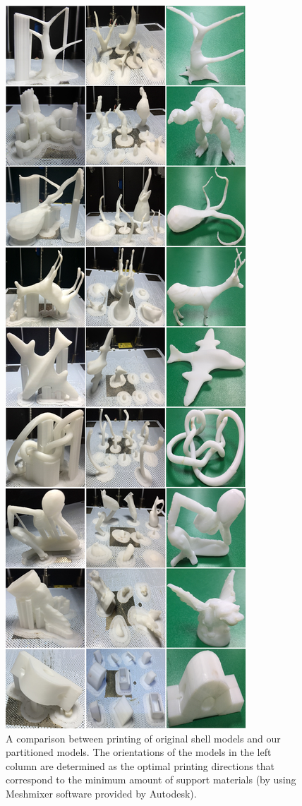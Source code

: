 \begin{figure}[t]
  \centering
  \includegraphics[width=0.975\linewidth]{figs/experiment.png}
  \caption{\label{fig:experiment}%
           A comparison between printing of original shell models and our partitioned models. The orientations of the models in the left column are determined as the optimal printing directions that correspond to the minimum amount of support materials (by using Meshmixer software provided by Autodesk). }
\end{figure}

